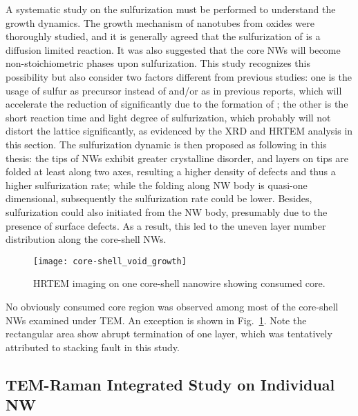 A systematic study on the sulfurization must be performed to understand the growth dynamics. The growth mechanism of  nanotubes from oxides were thoroughly studied,\cite{Feldman1998} and it is generally agreed that the sulfurization of  is a diffusion limited reaction.\cite{Feldman1996} It was also suggested that the core  NWs will become non-stoichiometric phases upon sulfurization.\cite{Feldman1996,ZAK2009} This study recognizes this possibility but also consider two factors different from previous studies: one is the usage of sulfur as precursor instead of  and/or  as in previous reports, which will accelerate the reduction of  significantly due to the formation of ; the other is the short reaction time and light degree of sulfurization, which probably will not distort the  lattice significantly, as evidenced by the XRD and HRTEM analysis in this section. The sulfurization dynamic is then proposed as following in this thesis: the tips of  NWs exhibit greater crystalline disorder, and  layers on tips are folded at least along two axes, resulting a higher density of defects and thus a higher sulfurization rate; while the folding along NW body is quasi-one dimensional, subsequently the sulfurization rate could be lower. Besides, sulfurization could also initiated from the NW body, presumably due to the presence of surface defects. As a result, this led to the uneven  layer number distribution along the core-shell NWs.

\begin{figure}[htb]
\centering
\texttt{[image: core-shell\_void\_growth]}
\caption[HRTEM imaging on one core-shell nanowire showing consumed core]{HRTEM imaging on one core-shell nanowire showing consumed core.}
\label{fig:ch5ws2tem2}
\end{figure}
No obviously consumed core region was observed among most of the core-shell NWs examined under TEM. An exception is shown in Fig.~\ref{fig:ch5ws2tem2}. Note the rectangular area show abrupt termination of one  layer, which was tentatively attributed to stacking fault in this study.


\subsection{TEM-Raman Integrated Study on Individual NW}\label{tms:raman} 

